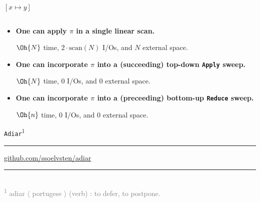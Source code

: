 \documentclass[english, aspectratio=169]{beamer}
\newcommand{\scan}[1]{\text{scan}(#1)}
\begin{document}
\begin{frame}[t]{$[x \mapsto y]$}
{\begin{columns}
\begin{column}{0.25\textwidth}
      \end{column}
    \end{columns}
  }%
   {
    \begin{itemize}
    \item {\bf One can apply $\pi$ in a single linear scan.}

      $\Oh{N}$ time, $2 \cdot \scan{N}$ I/Os, and $N$ external space.

    \item {\bf One can incorporate $\pi$ into a (succeeding) top-down \texttt{Apply} sweep.}

      $\Oh{N}$ time, $0$ I/Os, and $0$ external space.

    \item {\bf One can incorporate $\pi$ into a (preceeding) bottom-up \texttt{Reduce} sweep.}

      $\Oh{n}$ time, $0$ I/Os, and $0$ external space.
    \end{itemize}
  }
\end{frame}

%
%
\blankframe
\begin{frame}{}
  \vspace{60pt}

  \begin{center}
    {\fontsize{42}{50}\selectfont \texttt{Adiar}\textsuperscript{\normalsize 1}}

    \rule{180pt}{0.6pt}

    {
      \href{http://github.com/ssoelvsten/adiar}{github.com/ssoelvsten/adiar}
    }
  \end{center}

  \vspace{40pt}

  \textcolor{gray}{
    \rule{150pt}{0.6pt}
  }\\
  \textcolor{gray}{\footnotesize \textsuperscript{1}
    adiar $\langle$ portugese $\rangle$ (verb) : to defer, to postpone.
  }
\end{frame}
\end{document}
